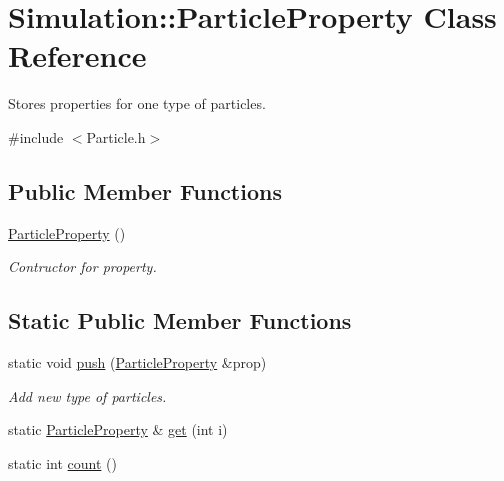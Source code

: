 \hypertarget{classSimulation_1_1ParticleProperty}{\section{Simulation\-:\-:Particle\-Property Class Reference}
\label{classSimulation_1_1ParticleProperty}
}


Stores properties for one type of particles.  




{\ttfamily \#include $<$Particle.\-h$>$}

\subsection*{Public Member Functions}
\begin{DoxyCompactItemize}
\item 
\hyperlink{classSimulation_1_1ParticleProperty_a6a931af7787ba8bb7ee3bba88cc875e6}{Particle\-Property} ()
\begin{DoxyCompactList}\small\item\em Contructor for property. \end{DoxyCompactList}\end{DoxyCompactItemize}
\subsection*{Static Public Member Functions}
\begin{DoxyCompactItemize}
\item 
static void \hyperlink{classSimulation_1_1ParticleProperty_af725f9c9d30cb1b64fe669a7842de12c}{push} (\hyperlink{classSimulation_1_1ParticleProperty}{Particle\-Property} \&prop)
\begin{DoxyCompactList}\small\item\em Add new type of particles. \end{DoxyCompactList}\item 
static \hyperlink{classSimulation_1_1ParticleProperty}{Particle\-Property} \& \hyperlink{classSimulation_1_1ParticleProperty_acab370093ec1ad31402b68aaf386dad2}{get} (int i)
\item 
static int \hyperlink{classSimulation_1_1ParticleProperty_a000e6d8061005aa0352ad66d97e41efc}{count} ()
\end{DoxyCompactItemize}
